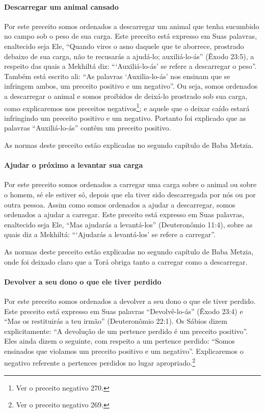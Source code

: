 \paragraph{Descarregar um animal cansado}

Por este preceito somos ordenados a descarregar um animal que tenha
sucumbido no campo sob o peso de sua carga. Este preceito está expresso
em Suas palavras, enaltecido seja Ele, ``Quando vires o asno daquele que
te aborrece, prostrado debaixo de sua carga, não te recusarás a
ajudá-lo; auxiliá-lo-ás'' (Êxodo 23:5), a respeito das quais a Mekhiltá
diz: ```Auxiliá-lo-ás' se refere a descarregar o peso''. Também está
escrito ali: ``As palavras `Auxilia-lo-ás' nos ensinam que se infringem
ambos, um preceito positivo e um negativo''. Ou seja, somos ordenados a
descarregar o animal e somos proibidos de deixá-lo prostrado sob sua
carga, como explicaremos nos preceitos negativos\footnote{Ver o preceito negativo 270.};
e aquele que o deixar caído estará infringindo um preceito positivo e um
negativo. Portanto foi explicado que as palavras ``Auxiliá-lo-ás''
contêm um preceito positivo.

As normas deste preceito estão explicadas no segundo capítulo de Baba Metzia.

\paragraph{Ajudar o próximo a levantar sua carga}

Por este preceito somos ordenados a carregar uma carga sobre o animal
ou sobre o homem, sé ele estiver só, depois que ela tiver sido
descarregada por nós ou por outra pessoa. Assim como somos ordenados a
ajudar a descarregar, somos ordenados a ajudar a carregar. Este
preceito está expresso em Suas palavras, enaltecido seja Ele, ``Mas
ajudarás a levantá-los'' (Deuteronômio 11:4), sobre as quais diz a
Mekhiltá: ```Ajudarás a levantá-los' se refere a carregar''.

As normas deste preceito estão explicadas no segundo capítulo de Baba
Metzia, onde foi deixado claro que a Torá obriga tanto a carregar como
a descarregar.

\paragraph{Devolver a seu dono o que ele tiver perdido}

Por este preceito somos ordenados a devolver a seu dono o que ele tiver
perdido. Este preceito está expresso em Suas palavras ``Devolvê-lo-ás''
(Êxodo 23:4) e ``Mas os restituirás a teu irmão'' (Deuteronômio 22:1).
Os Sábios dizem explicitamente: ``A devolução de um pertence perdido é
um preceito positivo''. Eles ainda dizem o seguinte, com respeito a um
pertence perdido: ``Somos ensinados que violamos um preceito positivo e
um negativo''. Explicaremos o negativo referente a pertences perdidos no lugar apropriado.\footnote{Ver o preceito negativo 269.}

